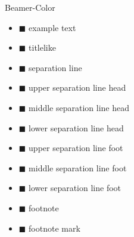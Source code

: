 {\begin{frame}{Beamer-Color}
\begin{multicols}{3}
\begin{itemize}
                    \item { $\blacksquare$ example text }\\
                    \item { $\blacksquare$ titlelike }\\
                    \item { $\blacksquare$ separation line }\\
                    \item { $\blacksquare$ upper separation line head}\\
                    \item { $\blacksquare$ middle separation line head}\\
                    \item { $\blacksquare$ lower separation line head}\\
                    \item { $\blacksquare$ upper separation line foot}\\
                    \item { $\blacksquare$ middle separation line foot}\\
                    \item { $\blacksquare$ lower separation line foot}\\
                    \item { $\blacksquare$ footnote}\\
                    \item { $\blacksquare$ footnote mark}\\
                \end{itemize}
            \end{multicols}
        \end{frame}
    }
